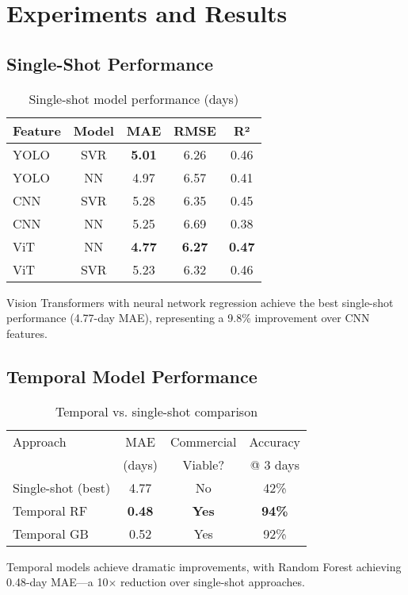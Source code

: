 \documentclass[10pt,twocolumn,letterpaper]{article}
\begin{document}
\section{Experiments and Results}

\subsection{Single-Shot Performance}

\begin{table}[h]
\centering
\caption{Single-shot model performance (days)}
\begin{tabular}{lcccc}
\toprule
Feature & Model & MAE & RMSE & R² \\
\midrule
YOLO & SVR & \textbf{5.01} & 6.26 & 0.46 \\
YOLO & NN & 4.97 & 6.57 & 0.41 \\
CNN & SVR & 5.28 & 6.35 & 0.45 \\
CNN & NN & 5.25 & 6.69 & 0.38 \\
ViT & NN & \textbf{4.77} & \textbf{6.27} & \textbf{0.47} \\
ViT & SVR & 5.23 & 6.32 & 0.46 \\
\bottomrule
\end{tabular}
\end{table}

Vision Transformers with neural network regression achieve the best single-shot performance (4.77-day MAE), representing a 9.8\% improvement over CNN features.

\subsection{Temporal Model Performance}

\begin{table}[h]
\centering
\caption{Temporal vs. single-shot comparison}
\begin{tabular}{lccc}
\toprule
Approach & MAE & Commercial & Accuracy \\
 & (days) & Viable? & @ 3 days \\
\midrule
Single-shot (best) & 4.77 & No & 42\% \\
Temporal RF & \textbf{0.48} & \textbf{Yes} & \textbf{94\%} \\
Temporal GB & 0.52 & Yes & 92\% \\
\bottomrule
\end{tabular}
\end{table}

Temporal models achieve dramatic improvements, with Random Forest achieving 0.48-day MAE—a 10× reduction over single-shot approaches.
\end{document}

